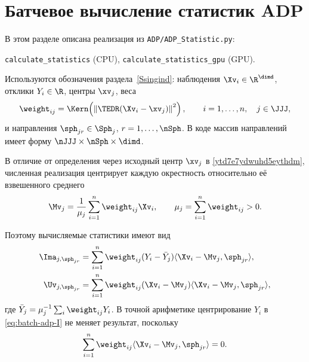 
\section{Батчевое вычисление статистик ADP}
\label{sec:adp-batched-statistics}

В этом разделе описана реализация из
\texttt{ADP/ADP\_Statistic.py}:
\begin{center}
    \texttt{calculate\_statistics} (CPU),\qquad
    \texttt{calculate\_statistics\_gpu} (GPU).
\end{center}
Используются обозначения
раздела~\ref{Ssingind}: наблюдения
$\Xv_i\in\R^{\dimd}$, отклики $Y_i\in\R$, центры
$\xv_j$, веса
\begin{equation}
    \weight_{ij}
    =
    \Kern\!\left(\left\|\TEDR(\Xv_i-\xv_j)\right\|^2\right),
    \qquad i=1,\ldots,n,
    \quad j\in\JJJ,
\label{eq:batch-adp-weights}
\end{equation}
и направления $\sph_{jr}\in\Sph_j$, $r=1,\ldots,\nSph$.
В коде массив направлений имеет форму
$\nJJJ\times\nSph\times\dimd$.

В отличие от определения через исходный центр $\xv_j$ в
\eqref{ytd7e7ydwuhd5eythdm}, численная реализация центрирует каждую
окрестность относительно её взвешенного среднего
\begin{equation}
    \Mv_j
    =
    \frac{1}{\mu_j}\sum_{i=1}^n \weight_{ij}\Xv_i,
    \qquad
    \mu_j=\sum_{i=1}^n\weight_{ij}>0.
\label{eq:batch-adp-local-mean}
\end{equation}

Поэтому вычисляемые статистики имеют вид
\begin{align}
    \Ima_{j,\sph_{jr}}
    &=
    \sum_{i=1}^n
    \weight_{ij}(Y_i-\bar Y_j)
    \langle \Xv_i-\Mv_j,\sph_{jr}\rangle,
\label{eq:batch-adp-I}
    \\
    \Uv_{j,\sph_{jr}}
    &=
    \sum_{i=1}^n
    \weight_{ij}(\Xv_i-\Mv_j)
    \langle \Xv_i-\Mv_j,\sph_{jr}\rangle,
\label{eq:batch-adp-U}
\end{align}
где
$\bar Y_j=\mu_j^{-1}\sum_i\weight_{ij}Y_i$.
В точной арифметике центрирование $Y_i$ в
\eqref{eq:batch-adp-I} не меняет результат, поскольку
\begin{equation}
    \sum_{i=1}^n
    \weight_{ij}\langle\Xv_i-\Mv_j,\sph_{jr}\rangle=0.
\label{eq:batch-adp-zero-moment}
\end{equation}

